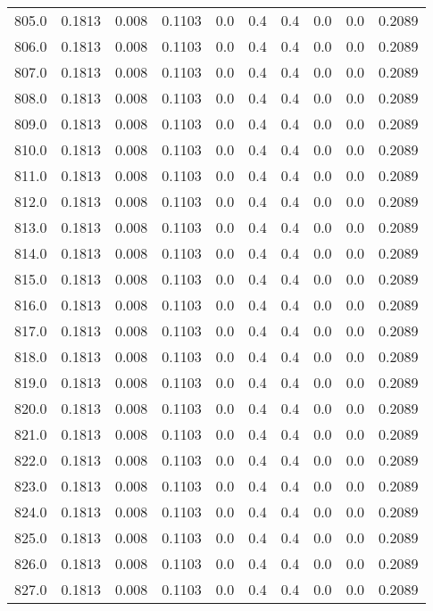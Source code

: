 \begin{longtable}{lrrrrrrrrr}
805.0 & 0.1813 & 0.008 & 0.1103 & 0.0 & 0.4 & 0.4 & 0.0 & 0.0 & 0.2089 \\
806.0 & 0.1813 & 0.008 & 0.1103 & 0.0 & 0.4 & 0.4 & 0.0 & 0.0 & 0.2089 \\
807.0 & 0.1813 & 0.008 & 0.1103 & 0.0 & 0.4 & 0.4 & 0.0 & 0.0 & 0.2089 \\
808.0 & 0.1813 & 0.008 & 0.1103 & 0.0 & 0.4 & 0.4 & 0.0 & 0.0 & 0.2089 \\
809.0 & 0.1813 & 0.008 & 0.1103 & 0.0 & 0.4 & 0.4 & 0.0 & 0.0 & 0.2089 \\
810.0 & 0.1813 & 0.008 & 0.1103 & 0.0 & 0.4 & 0.4 & 0.0 & 0.0 & 0.2089 \\
811.0 & 0.1813 & 0.008 & 0.1103 & 0.0 & 0.4 & 0.4 & 0.0 & 0.0 & 0.2089 \\
812.0 & 0.1813 & 0.008 & 0.1103 & 0.0 & 0.4 & 0.4 & 0.0 & 0.0 & 0.2089 \\
813.0 & 0.1813 & 0.008 & 0.1103 & 0.0 & 0.4 & 0.4 & 0.0 & 0.0 & 0.2089 \\
814.0 & 0.1813 & 0.008 & 0.1103 & 0.0 & 0.4 & 0.4 & 0.0 & 0.0 & 0.2089 \\
815.0 & 0.1813 & 0.008 & 0.1103 & 0.0 & 0.4 & 0.4 & 0.0 & 0.0 & 0.2089 \\
816.0 & 0.1813 & 0.008 & 0.1103 & 0.0 & 0.4 & 0.4 & 0.0 & 0.0 & 0.2089 \\
817.0 & 0.1813 & 0.008 & 0.1103 & 0.0 & 0.4 & 0.4 & 0.0 & 0.0 & 0.2089 \\
818.0 & 0.1813 & 0.008 & 0.1103 & 0.0 & 0.4 & 0.4 & 0.0 & 0.0 & 0.2089 \\
819.0 & 0.1813 & 0.008 & 0.1103 & 0.0 & 0.4 & 0.4 & 0.0 & 0.0 & 0.2089 \\
820.0 & 0.1813 & 0.008 & 0.1103 & 0.0 & 0.4 & 0.4 & 0.0 & 0.0 & 0.2089 \\
821.0 & 0.1813 & 0.008 & 0.1103 & 0.0 & 0.4 & 0.4 & 0.0 & 0.0 & 0.2089 \\
822.0 & 0.1813 & 0.008 & 0.1103 & 0.0 & 0.4 & 0.4 & 0.0 & 0.0 & 0.2089 \\
823.0 & 0.1813 & 0.008 & 0.1103 & 0.0 & 0.4 & 0.4 & 0.0 & 0.0 & 0.2089 \\
824.0 & 0.1813 & 0.008 & 0.1103 & 0.0 & 0.4 & 0.4 & 0.0 & 0.0 & 0.2089 \\
825.0 & 0.1813 & 0.008 & 0.1103 & 0.0 & 0.4 & 0.4 & 0.0 & 0.0 & 0.2089 \\
826.0 & 0.1813 & 0.008 & 0.1103 & 0.0 & 0.4 & 0.4 & 0.0 & 0.0 & 0.2089 \\
827.0 & 0.1813 & 0.008 & 0.1103 & 0.0 & 0.4 & 0.4 & 0.0 & 0.0 & 0.2089 \\

\end{longtable}
